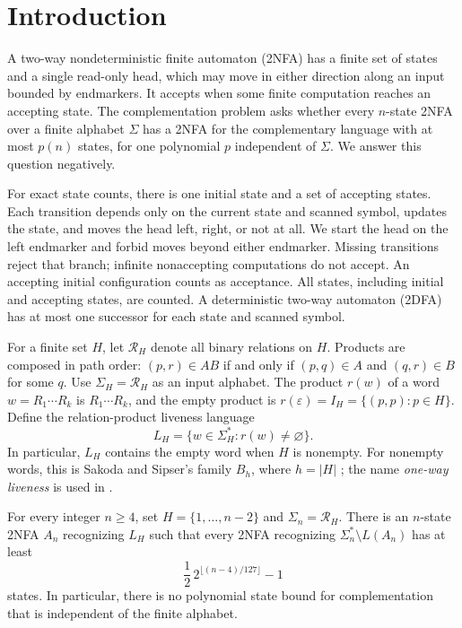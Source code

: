 \section{Introduction}
\label{sec:introduction}

A two-way nondeterministic finite automaton (2NFA) has a finite set of
states and a single read-only head, which may move in either direction
along an input bounded by endmarkers. It accepts when some finite
computation reaches an accepting state. The complementation problem asks
whether every $n$-state 2NFA over a finite alphabet $\Sigma$ has a 2NFA for
the complementary language with at most $p(n)$ states, for one polynomial
$p$ independent of $\Sigma$. We answer this question negatively.

For exact state counts, there is one initial state and a set of accepting
states. Each transition depends only on the current state and scanned
symbol, updates the state, and moves the head left, right, or not at all.
We start the head on the left endmarker and forbid moves beyond either
endmarker. Missing transitions
reject that branch; infinite nonaccepting computations do not accept.
An accepting initial configuration counts as acceptance. All states,
including initial and accepting states, are counted. A deterministic
two-way automaton (2DFA) has at most one successor for each state and
scanned symbol.

For a finite set $H$, let $\mathcal R_H$ denote all binary relations on
$H$. Products are composed in path order:
$(p,r)\in AB$ if and only if $(p,q)\in A$ and $(q,r)\in B$ for some $q$.
Use $\Sigma_H=\mathcal R_H$ as an input alphabet. The product $r(w)$ of a
word $w=R_1\cdots R_k$ is $R_1\cdots R_k$, and the empty product is
$r(\varepsilon)=I_H=\{(p,p):p\in H\}$. Define the relation-product
liveness language
\[
 L_H=\{w\in\Sigma_H^*:r(w)\ne\varnothing\}.
\]
In particular, $L_H$ contains the empty word when $H$ is nonempty.
For nonempty words, this is Sakoda and Sipser's family $B_h$, where
$h=|H|$ \cite[Section~2.1 and Theorem~2.3]{SakodaSipser1978}; the name
\emph{one-way liveness} is used in \cite[Section~2.2]{Kapoutsis2006}.

\begin{theorem}\label{main:theorem}
For every integer $n\ge4$, set $H=\{1,\ldots,n-2\}$ and
$\Sigma_n=\mathcal R_H$. There is an $n$-state 2NFA $A_n$ recognizing
$L_H$ such that every 2NFA recognizing
$\Sigma_n^*\setminus L(A_n)$ has at least
\[
 \frac12\,2^{\lfloor(n-4)/127\rfloor}-1
\]
states. In particular, there is no polynomial state bound for
complementation that is independent of the finite alphabet.
\end{theorem}

